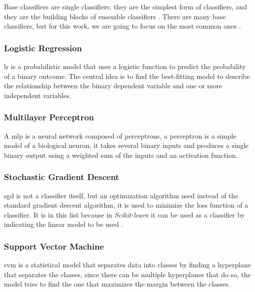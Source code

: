 Base classifiers are single classifiers; 
they are the simplest form of classifiers, and they are the building blocks of ensemble classifiers \cite{oza_classifier_2008}. There are many base classifiers, but for this work, we are going to focus on the most common ones \cite{gong_top_2022}.


\subsubsection{Logistic Regression}
\ac{lr} is a probabilistic model that uses a logistic function to predict the probability of a binary outcome. The central idea is to find the best-fitting model to describe the relationship between the binary dependent variable and one or more independent variables.

\subsubsection{Multilayer Perceptron}
A \ac{mlp} is a neural network composed of perceptrons, a perceptron is a simple model of a biological neuron, it takes several binary inputs and produces a single binary output using a weighted sum of the inputs and an activation function.

\subsubsection{Stochastic Gradient Descent}
\ac{sgd} is not a classifier itself, but an optimization algorithm used instead of the standard gradient descent algorithm, it is used to minimize the loss function of a classifier. It is in this list because in \textit{Scikit-learn} \cite{pedregosa_scikit-learn_2011} it can be used as a classifier by indicating the linear model to be used \cite{noauthor_sklearnlinear_modelsgdclassifier_nodate}.

\subsubsection{Support Vector Machine}
\ac{svm} is a statistical model that separates data into classes by finding a hyperplane that separates the classes, since there can be multiple hyperplanes that do so, the model tries to find the one that maximizes the margin between the classes.

